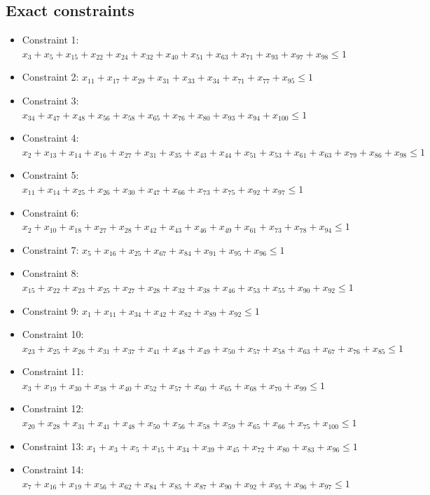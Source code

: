 \documentclass[11pt]{article}
\begin{document}
\subsection*{Exact constraints}
\begin{itemize}
\item Constraint 1: $x_{3} + x_{5} + x_{15} + x_{22} + x_{24} + x_{32} + x_{40} + x_{51} + x_{63} + x_{71} + x_{93} + x_{97} + x_{98} \le 1$
\item Constraint 2: $x_{11} + x_{17} + x_{29} + x_{31} + x_{33} + x_{34} + x_{71} + x_{77} + x_{95} \le 1$
\item Constraint 3: $x_{34} + x_{47} + x_{48} + x_{56} + x_{58} + x_{65} + x_{76} + x_{80} + x_{93} + x_{94} + x_{100} \le 1$
\item Constraint 4: $x_{2} + x_{13} + x_{14} + x_{16} + x_{27} + x_{31} + x_{35} + x_{43} + x_{44} + x_{51} + x_{53} + x_{61} + x_{63} + x_{79} + x_{86} + x_{98} \le 1$
\item Constraint 5: $x_{11} + x_{14} + x_{25} + x_{26} + x_{30} + x_{47} + x_{66} + x_{73} + x_{75} + x_{92} + x_{97} \le 1$
\item Constraint 6: $x_{2} + x_{10} + x_{18} + x_{27} + x_{28} + x_{42} + x_{43} + x_{46} + x_{49} + x_{61} + x_{73} + x_{78} + x_{94} \le 1$
\item Constraint 7: $x_{5} + x_{16} + x_{25} + x_{67} + x_{84} + x_{91} + x_{95} + x_{96} \le 1$
\item Constraint 8: $x_{15} + x_{22} + x_{23} + x_{25} + x_{27} + x_{28} + x_{32} + x_{38} + x_{46} + x_{53} + x_{55} + x_{90} + x_{92} \le 1$
\item Constraint 9: $x_{1} + x_{11} + x_{34} + x_{42} + x_{82} + x_{89} + x_{92} \le 1$
\item Constraint 10: $x_{23} + x_{25} + x_{26} + x_{31} + x_{37} + x_{41} + x_{48} + x_{49} + x_{50} + x_{57} + x_{58} + x_{63} + x_{67} + x_{76} + x_{85} \le 1$
\item Constraint 11: $x_{3} + x_{19} + x_{30} + x_{38} + x_{40} + x_{52} + x_{57} + x_{60} + x_{65} + x_{68} + x_{70} + x_{99} \le 1$
\item Constraint 12: $x_{20} + x_{28} + x_{31} + x_{41} + x_{48} + x_{50} + x_{56} + x_{58} + x_{59} + x_{65} + x_{66} + x_{75} + x_{100} \le 1$
\item Constraint 13: $x_{1} + x_{3} + x_{5} + x_{15} + x_{34} + x_{39} + x_{45} + x_{72} + x_{80} + x_{83} + x_{96} \le 1$
\item Constraint 14: $x_{7} + x_{16} + x_{19} + x_{56} + x_{62} + x_{84} + x_{85} + x_{87} + x_{90} + x_{92} + x_{95} + x_{96} + x_{97} \le 1$

\end{itemize}
\end{document}
